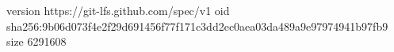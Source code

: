 version https://git-lfs.github.com/spec/v1
oid sha256:9b06d073f4e2f29d691456f77f171c3dd2ec0aea03da489a9e97974941b97fb9
size 6291608
